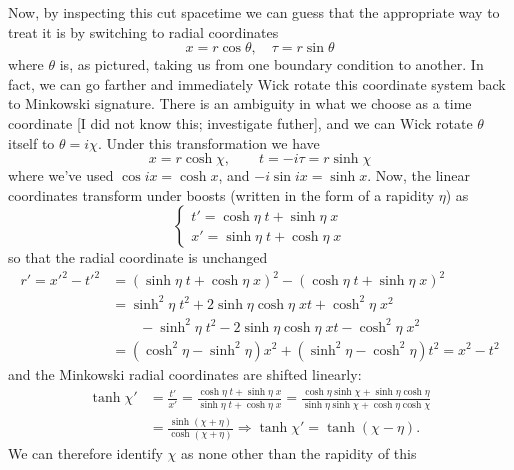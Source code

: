 \documentclass{report}
\begin{document}
Now, by inspecting this cut spacetime we can guess that the appropriate way to 
treat it is by switching to radial coordinates 
\begin{equation*}
	x = r \cos\theta, \quad \tau = r \sin\theta
\end{equation*}
where $ \theta $ is, as pictured, taking us from one boundary condition to another. 
In fact, we can go farther and immediately Wick rotate this coordinate 
system back to Minkowski signature. There is an ambiguity in what we choose 
as a time coordinate {\color{myred}[I did not know this; investigate futher]}, 
and we can Wick rotate $ \theta $ itself to $ \theta= i\chi $. Under this 
transformation we have 
\begin{equation*}
	x = r\cosh \chi,\qquad t = -i\tau = r\sinh \chi
\end{equation*}
where we've used $ \cos ix = \cosh x $, and $ -i\sin i x = \sinh x $. Now, 
the linear coordinates transform under boosts (written in the form of a rapidity $ \eta $) as
\begin{equation*}
	\begin{cases}
	t' = \cosh \eta \; t + \sinh \eta \; x  \\ 
	x' = \sinh \eta \; t + \cosh \eta \; x
	\end{cases}
\end{equation*}
so that the radial coordinate is unchanged
\begin{align*}
	r' = x'^2 - t'^2 
		&= (\sinh \eta \; t + \cosh \eta \; x)^2 
			- (\cosh \eta \; t + \sinh \eta \; x)^2\\
		&= \sinh^2 \eta \; t^2 + 2\sinh\eta \cosh \eta \; xt 
			+ \cosh^2 \eta \; x^2\\
		 &\qquad - \sinh^2 \eta \; t^2 - 2\sinh\eta \cosh \eta \; xt 
			- \cosh^2 \eta \; x^2\\
		&= (\cosh^2 \eta - \sinh^2 \eta )x^2 +
			(\sinh^2 \eta - \cosh^2 \eta) t^2 
		= x^2 - t^2
\end{align*}
and the Minkowski radial coordinates are shifted linearly:
\begin{align*}
	\tanh \chi' 
		&= \frac{t'}{x'} = \frac{\cosh\eta \; t + \sinh \eta \; x}{\sinh \eta \; t + \cosh \eta \; x}
		= \frac{\cosh \eta \sinh \chi + \sinh \eta \cosh \eta}{\sinh \eta \sinh \chi 
			+ \cosh \eta \cosh \chi}\\ 
		&= \frac{\sinh(\chi + \eta)}{\cosh(\chi + \eta)}
		\Longrightarrow 
		\tanh \chi ' = \tanh(\chi - \eta).
\end{align*}
We can therefore identify $ \chi $ as none other than the rapidity of this 
\end{document}
